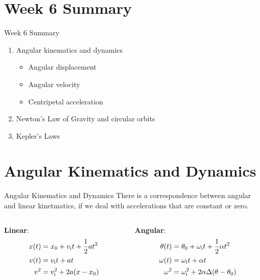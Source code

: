 \documentclass{beamer}
\begin{document}
\section{Week 6 Summary}

\begin{frame}{Week 6 Summary}
\begin{enumerate}
\item \alert{Angular} kinematics and dynamics
\begin{itemize}
\item Angular displacement
\item Angular velocity
\item Centripetal acceleration
\end{itemize}
\item \alert{Newton's Law of Gravity} and circular orbits
\item Kepler's Laws
\end{enumerate}
\end{frame}

\section{Angular Kinematics and Dynamics}

\begin{frame}{Angular Kinematics and Dynamics}
There is a correspondence between \alert{angular and linear kinetmatics}, if we deal with accelerations that are constant or zero.
\begin{columns}[T]
\begin{column}{0.5\textwidth}
\centering
\textbf{Linear}:
\begin{align}
x(t) &= x_{\rm 0} + v_{\rm i}t + \frac{1}{2}at^2 \\
v(t) &= v_{\rm i}t + at \\
v^2 &= v_{\rm i}^2 + 2a(x-x_{\rm 0})
\end{align}
\end{column}
\begin{column}{0.5\textwidth}
\centering
\textbf{Angular}:
\begin{align}
\theta(t) &= \theta_{\rm 0} + \omega_{\rm i}t + \frac{1}{2}\alpha t^2 \\
\omega(t) &= \omega_{\rm i}t + \alpha t \\
\omega^2 &= \omega_{\rm i}^2 + 2\alpha\Delta(\theta-\theta_{\rm 0})
\end{align}
\end{column}
\end{columns}
\end{frame}
\end{document}

